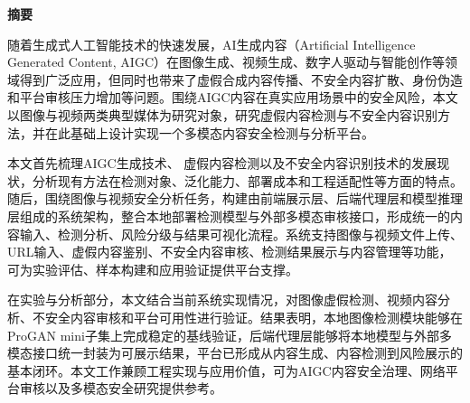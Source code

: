 \begin{center}
  {\heiti{}\bfseries 摘\qquad 要}
\end{center}

\vspace{1.5\baselineskip}

随着生成式人工智能技术的快速发展，AI生成内容（Artificial Intelligence Generated Content, AIGC）在图像生成、视频生成、数字人驱动与智能创作等领域得到广泛应用，但同时也带来了虚假合成内容传播、不安全内容扩散、身份伪造和平台审核压力增加等问题。围绕AIGC内容在真实应用场景中的安全风险，本文以图像与视频两类典型媒体为研究对象，研究虚假内容检测与不安全内容识别方法，并在此基础上设计实现一个多模态内容安全检测与分析平台。

本文首先梳理AIGC生成技术、 虚假内容检测以及不安全内容识别技术的发展现状，分析现有方法在检测对象、泛化能力、部署成本和工程适配性等方面的特点。随后，围绕图像与视频安全分析任务，构建由前端展示层、后端代理层和模型推理层组成的系统架构，整合本地部署检测模型与外部多模态审核接口，形成统一的内容输入、检测分析、风险分级与结果可视化流程。系统支持图像与视频文件上传、URL输入、虚假内容鉴别、不安全内容审核、检测结果展示与内容管理等功能，可为实验评估、样本构建和应用验证提供平台支撑。

在实验与分析部分，本文结合当前系统实现情况，对图像虚假检测、视频内容分析、不安全内容审核和平台可用性进行验证。结果表明，本地图像检测模块能够在ProGAN mini子集上完成稳定的基线验证，后端代理层能够将本地模型与外部多模态接口统一封装为可展示结果，平台已形成从内容生成、内容检测到风险展示的基本闭环。本文工作兼顾工程实现与应用价值，可为AIGC内容安全治理、网络平台审核以及多模态安全研究提供参考。

\vspace{1em}
